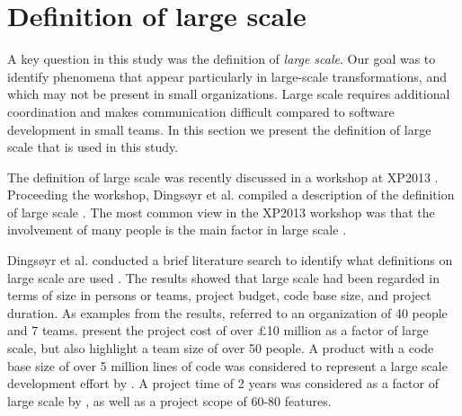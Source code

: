 % 
% 
% 
% 
% 
% 
% 
% 
% 
% 
% 
% 
% 
% 


\section{Definition of large scale}
\label{sec:largescale}

A key question in this study was the definition of \emph{large scale}. Our goal
was to identify phenomena that appear particularly in large-scale
transformations, and which may not be present in small organizations. Large
scale requires additional coordination and makes communication difficult
compared to software development in small teams. In this section we present the
definition of large scale that is used in this study.

The definition of large scale was recently discussed in a workshop at XP2013
\citep{Dingsoyr2013a}. Proceeding the workshop, Dingsøyr et al.
compiled a description of the definition of large scale \citep{Dingsoyr2013b}.
The most common view in the XP2013 workshop was that the involvement of many
people is the main factor in large scale \citep{Dingsoyr2013b}.

Dingsøyr et al. conducted a brief literature search to identify what definitions
on large scale are used \citep{Dingsoyr2013b}. The results showed that large
scale had been regarded in terms of size in persons or teams, project budget,
code base size, and project duration. As examples from the results,
\citet{Paasivaara2008} referred to an organization of 40 people and 7 teams.
\citet{Berger2009} present the project cost of over £10 million as a factor of
large scale, but also highlight a team size of over 50 people. A product with a
code base size of over 5 million lines of code was considered to represent a
large scale development effort by \citet{Petersen2010}. A project time of 2
years was considered as a factor of large scale by \citet{Bjarnason2011}, as
well as a project scope of 60-80 features.

